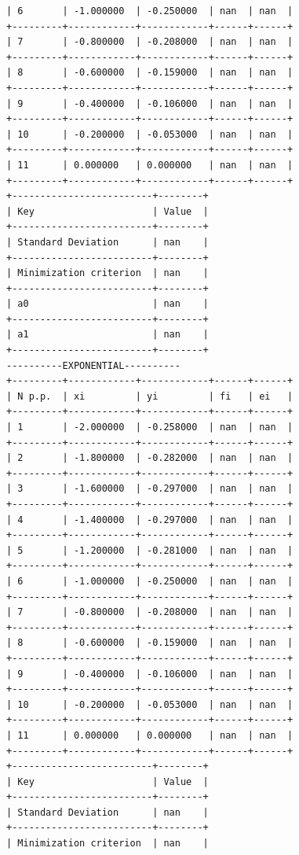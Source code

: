 \documentclass[12pt,one column]{article}
\begin{document}
\begin{verbatim}
| 6       | -1.000000  | -0.250000  | nan  | nan  | 
+---------+------------+------------+------+------+
| 7       | -0.800000  | -0.208000  | nan  | nan  | 
+---------+------------+------------+------+------+
| 8       | -0.600000  | -0.159000  | nan  | nan  | 
+---------+------------+------------+------+------+
| 9       | -0.400000  | -0.106000  | nan  | nan  | 
+---------+------------+------------+------+------+
| 10      | -0.200000  | -0.053000  | nan  | nan  | 
+---------+------------+------------+------+------+
| 11      | 0.000000   | 0.000000   | nan  | nan  | 
+---------+------------+------------+------+------+
+-------------------------+--------+
| Key                     | Value  | 
+-------------------------+--------+
| Standard Deviation      | nan    | 
+-------------------------+--------+
| Minimization criterion  | nan    | 
+-------------------------+--------+
| a0                      | nan    | 
+-------------------------+--------+
| a1                      | nan    | 
+-------------------------+--------+
----------EXPONENTIAL----------
+---------+------------+------------+------+------+
| N p.p.  | xi         | yi         | fi   | ei   | 
+---------+------------+------------+------+------+
| 1       | -2.000000  | -0.258000  | nan  | nan  | 
+---------+------------+------------+------+------+
| 2       | -1.800000  | -0.282000  | nan  | nan  | 
+---------+------------+------------+------+------+
| 3       | -1.600000  | -0.297000  | nan  | nan  | 
+---------+------------+------------+------+------+
| 4       | -1.400000  | -0.297000  | nan  | nan  | 
+---------+------------+------------+------+------+
| 5       | -1.200000  | -0.281000  | nan  | nan  | 
+---------+------------+------------+------+------+
| 6       | -1.000000  | -0.250000  | nan  | nan  | 
+---------+------------+------------+------+------+
| 7       | -0.800000  | -0.208000  | nan  | nan  | 
+---------+------------+------------+------+------+
| 8       | -0.600000  | -0.159000  | nan  | nan  | 
+---------+------------+------------+------+------+
| 9       | -0.400000  | -0.106000  | nan  | nan  | 
+---------+------------+------------+------+------+
| 10      | -0.200000  | -0.053000  | nan  | nan  | 
+---------+------------+------------+------+------+
| 11      | 0.000000   | 0.000000   | nan  | nan  | 
+---------+------------+------------+------+------+
+-------------------------+--------+
| Key                     | Value  | 
+-------------------------+--------+
| Standard Deviation      | nan    | 
+-------------------------+--------+
| Minimization criterion  | nan    | 

\end{verbatim}
\end{document}
